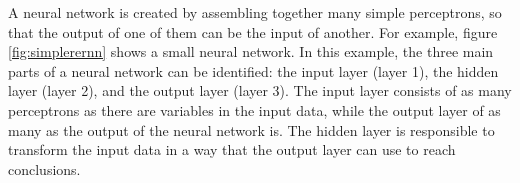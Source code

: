 A neural network is created by assembling together many simple perceptrons, so that the output of one of them can be the input of another. For example, figure \ref{fig:simplerernn} shows a small neural network. In this example, the three main parts of a neural network can be identified: the input layer (layer 1), the hidden layer (layer 2), and the output layer (layer 3). The input layer consists of as many perceptrons as there are variables in the input data, while the output layer of as many as the output of the neural network is. The hidden layer is responsible to transform the input data in a way that the output layer can use to reach conclusions.



